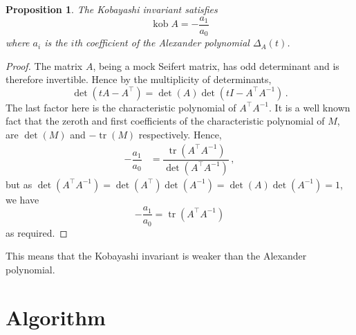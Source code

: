 \documentclass[12pt]{report}
\newcommand{\kob}{\operatorname{kob}}
\newtheorem*{proposition}{Proposition}
\begin{document}
\begin{proposition}
The Kobayashi invariant satisfies
\[\kob A = -\dfrac{a_{1}}{a_{0}}\]
where $a_{i}$ is the $i$th coefficient of the Alexander polynomial $\Delta_{A}(t)$.
\end{proposition}
\begin{proof}
The matrix $A$, being a mock Seifert matrix, has odd determinant \cite{mock-seifert-matrices} and is therefore invertible. Hence by the multiplicity of determinants,
\[\det(tA - A^{\top}) = \det(A)\det(tI - A^{\top}A^{-1})\,.\]
The last factor here is the characteristic polynomial of $A^{\top}A^{-1}$. It is a well known fact that the zeroth and first coefficients of the characteristic polynomial of $M$, are $\det(M)$ and $-\operatorname{tr}(M)$ respectively. Hence,
\begin{align*}
-\dfrac{a_{1}}{a_{0}}	& = \dfrac{\operatorname{tr}(A^{\top}A^{-1})}{\det(A^{\top}A^{-1})}\,,
\end{align*}
but as $\det(A^{\top}A^{-1}) = \det(A^{\top})\det(A^{-1}) = \det(A)\det(A^{-1}) = 1$, we have
\[-\dfrac{a_{1}}{a_{0}} = \operatorname{tr}(A^{\top}A^{-1})\]
as required.
\end{proof}

This means that the Kobayashi invariant is weaker than the Alexander polynomial.


\newpage
\printbibliography[title=References]


\appendix
{}
\titlespacing*{\chapter}{0pt}{40pt}{30pt}

\chapter{Algorithm}
\end{document}
